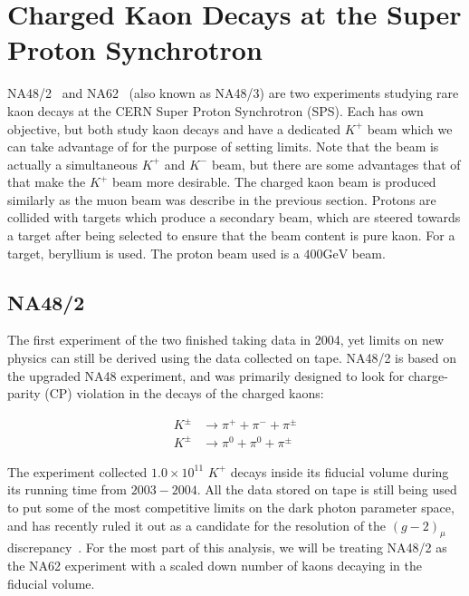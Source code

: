 \section{Charged Kaon Decays at the Super Proton Synchrotron}
\label{sec:na48_na62_experiment}
NA48/2~\cite{Batley:1999fv} and NA62~\cite{Martellotti:2015kna} (also known as NA48/3) are two experiments studying rare kaon decays at the CERN Super Proton Synchrotron (SPS).
Each has own objective, but both study kaon decays and have a dedicated $K^+$ beam which we can take advantage of for the purpose of setting limits.
Note that the beam is actually a simultaneous $K^+$ and $K^-$ beam, but there are some advantages that of that make the $K^+$ beam more desirable.
The charged kaon beam is produced similarly as the muon beam was describe in the previous section.
Protons are collided with targets which produce a secondary beam, which are steered towards a target after being selected to ensure that the beam content is pure kaon.
For a target, beryllium is used.
The proton beam used is a $400\textrm{GeV}$ beam.

\subsection{NA48/2}
The first experiment of the two finished taking data in 2004, yet limits on new physics can still be derived using the data collected on tape.
NA48/2 is based on the upgraded NA48 experiment, and was primarily designed to look for charge-parity (CP) violation in the decays of the charged kaons:

\begin{align}
K^\pm & \rightarrow \pi^+ + \pi^- + \pi^\pm \\
K^\pm & \rightarrow \pi^0 + \pi^0 + \pi^\pm
\end{align}

The experiment collected $1.0 \times 10^{11}$ $K^+$ decays inside its fiducial volume during its running time from $2003-2004$.
All the data stored on tape is still being used to put some of the most competitive limits on the dark photon parameter space, and has recently ruled it out as a candidate for the resolution of the $(g-2)_\mu$ discrepancy~\cite{Goudzovski:2014rwa}.
For the most part of this analysis, we will be treating NA48/2 as the NA62 experiment with a scaled down number of kaons decaying in the fiducial volume.

